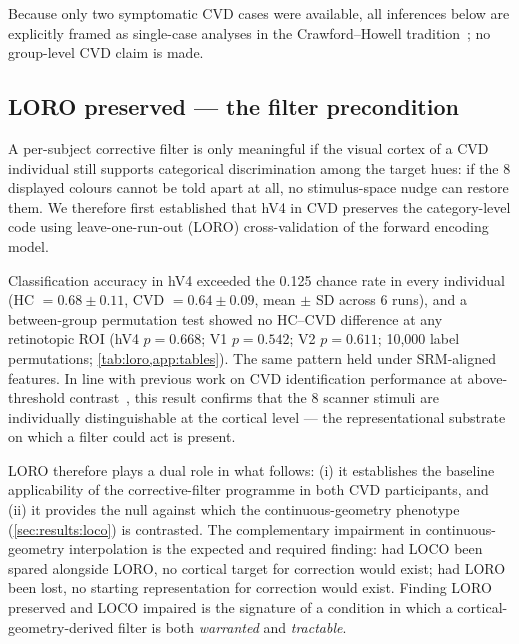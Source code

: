Because only two symptomatic CVD cases were available, all inferences
below are explicitly framed as single-case analyses in the
Crawford--Howell tradition~\citep{crawford1998, schuett2023}; no
group-level CVD claim is made.


\subsection{LORO preserved --- the filter precondition}
\label{sec:results:loro}

A per-subject corrective filter is only meaningful if the visual cortex
of a CVD individual still supports categorical discrimination among
the target hues: if the 8 displayed colours cannot be told apart at
all, no stimulus-space nudge can restore them. We therefore first
established that hV4 in CVD preserves the category-level code using
leave-one-run-out (LORO) cross-validation of the forward encoding
model.

Classification accuracy in hV4 exceeded the 0.125 chance rate in every
individual (HC $= 0.68 \pm 0.11$, CVD $= 0.64 \pm 0.09$, mean $\pm$ SD
across 6 runs), and a between-group permutation test showed no
HC--CVD difference at any retinotopic ROI (hV4 $p = 0.668$; V1
$p = 0.542$; V2 $p = 0.611$; 10{,}000 label permutations;
\cref{tab:loro,app:tables}). The same pattern held under SRM-aligned
features. In line with previous work on CVD identification performance
at above-threshold contrast~\citep{bosten2019, boehm2014}, this result
confirms that the 8 scanner stimuli are individually distinguishable
at the cortical level --- the representational substrate on which a
filter could act is present.

LORO therefore plays a dual role in what follows: (i) it establishes
the baseline applicability of the corrective-filter programme in both
CVD participants, and (ii) it provides the null against which the
continuous-geometry phenotype (\cref{sec:results:loco}) is contrasted.
The complementary impairment in continuous-geometry interpolation is
the expected and required finding: had LOCO been spared alongside
LORO, no cortical target for correction would exist; had LORO been
lost, no starting representation for correction would exist. Finding
LORO preserved and LOCO impaired is the signature of a condition in
which a cortical-geometry-derived filter is both \emph{warranted} and
\emph{tractable}.

